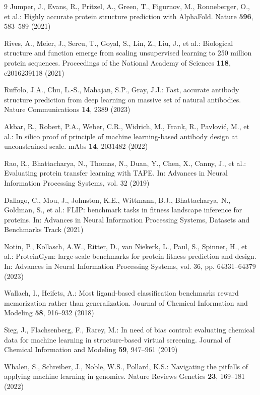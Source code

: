 \documentclass[pdflatex,sn-nature]{sn-jnl}
\theoremstyle{thmstyleone}
\theoremstyle{thmstyletwo}
\theoremstyle{thmstylethree}
\begin{document}
\begin{thebibliography}{9}
Jumper, J., Evans, R., Pritzel, A., Green, T., Figurnov, M., Ronneberger, O.,
et al.: Highly accurate protein structure prediction with AlphaFold. Nature
\textbf{596}, 583--589 (2021)

Rives, A., Meier, J., Sercu, T., Goyal, S., Lin, Z., Liu, J., et al.:
Biological structure and function emerge from scaling unsupervised learning to
250 million protein sequences. Proceedings of the National Academy of Sciences
\textbf{118}, e2016239118 (2021)

Ruffolo, J.A., Chu, L.-S., Mahajan, S.P., Gray, J.J.: Fast, accurate antibody
structure prediction from deep learning on massive set of natural antibodies.
Nature Communications \textbf{14}, 2389 (2023)

Akbar, R., Robert, P.A., Weber, C.R., Widrich, M., Frank, R., Pavlovi\'c, M.,
et al.: In silico proof of principle of machine learning-based antibody design
at unconstrained scale. mAbs \textbf{14}, 2031482 (2022)

Rao, R., Bhattacharya, N., Thomas, N., Duan, Y., Chen, X., Canny, J., et al.:
Evaluating protein transfer learning with TAPE. In: Advances in Neural
Information Processing Systems, vol. 32 (2019)

Dallago, C., Mou, J., Johnston, K.E., Wittmann, B.J., Bhattacharya, N.,
Goldman, S., et al.: FLIP: benchmark tasks in fitness landscape inference for
proteins. In: Advances in Neural Information Processing Systems, Datasets and
Benchmarks Track (2021)

Notin, P., Kollasch, A.W., Ritter, D., van Niekerk, L., Paul, S., Spinner, H.,
et al.: ProteinGym: large-scale benchmarks for protein fitness prediction and
design. In: Advances in Neural Information Processing Systems, vol. 36, pp.
64331--64379 (2023)

Wallach, I., Heifets, A.: Most ligand-based classification benchmarks reward
memorization rather than generalization. Journal of Chemical Information and
Modeling \textbf{58}, 916--932 (2018)

Sieg, J., Flachsenberg, F., Rarey, M.: In need of bias control: evaluating
chemical data for machine learning in structure-based virtual screening.
Journal of Chemical Information and Modeling \textbf{59}, 947--961 (2019)

Whalen, S., Schreiber, J., Noble, W.S., Pollard, K.S.: Navigating the pitfalls
of applying machine learning in genomics. Nature Reviews Genetics \textbf{23},
169--181 (2022)


\end{thebibliography}
\end{document}
